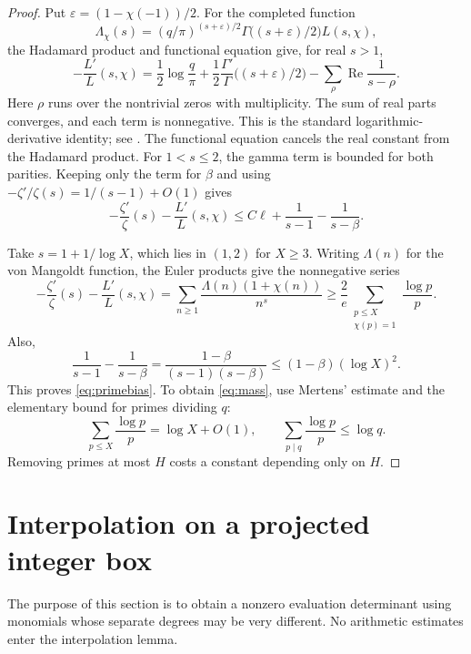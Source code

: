 \documentclass[11pt,a4paper]{amsart}
\theoremstyle{remark}
\numberwithin{equation}{section}
\begin{document}
\begin{proof}
Put $\varepsilon=(1-\chi(-1))/2$. For the completed function
\[
 \Lambda_\chi(s)=
 (q/\pi)^{(s+\varepsilon)/2}
 \Gamma\bigl((s+\varepsilon)/2\bigr)L(s,\chi),
\]
the Hadamard product and functional equation give, for real $s>1$,
\begin{equation}\label{eq:hadamard}
 -\frac{L'}{L}(s,\chi)
 =\frac12\log\frac q\pi
  +\frac12\frac{\Gamma'}{\Gamma}
        \bigl((s+\varepsilon)/2\bigr)
  -\sum_\rho\operatorname{Re}\frac1{s-\rho}.
\end{equation}
Here $\rho$ runs over the nontrivial zeros with multiplicity. The sum
of real parts converges, and each term is nonnegative. This is the
standard logarithmic-derivative identity; see
\cite[Sections~12 and 14]{Davenport}. The functional equation cancels
the real constant from the Hadamard product. For $1<s\le2$, the gamma
term is bounded for both parities. Keeping only the term for $\beta$
and using $-\zeta'/\zeta(s)=1/(s-1)+O(1)$ gives
\begin{equation}\label{eq:logderivative}
 -\frac{\zeta'}{\zeta}(s)-\frac{L'}{L}(s,\chi)
 \le C\ell+\frac1{s-1}-\frac1{s-\beta}.
\end{equation}

Take $s=1+1/\log X$, which lies in $(1,2)$ for $X\ge3$.
Writing $\Lambda(n)$ for the von Mangoldt function, the Euler
products give the nonnegative series
\[
 -\frac{\zeta'}{\zeta}(s)-\frac{L'}{L}(s,\chi)
 =\sum_{n\ge1}\frac{\Lambda(n)(1+\chi(n))}{n^s}
 \ge\frac2e\sum_{\substack{p\le X\\\chi(p)=1}}\frac{\log p}{p}.
\]
Also,
\[
 \frac1{s-1}-\frac1{s-\beta}
 =\frac{1-\beta}{(s-1)(s-\beta)}
 \le(1-\beta)(\log X)^2.
\]
This proves \eqref{eq:primebias}. To obtain \eqref{eq:mass}, use
Mertens' estimate and the elementary bound for primes dividing $q$:
\[
 \sum_{p\le X}\frac{\log p}{p}=\log X+O(1),
 \qquad \sum_{p\mid q}\frac{\log p}{p}\le\log q.
\]
Removing primes at most $H$ costs a constant depending only on $H$.
\end{proof}

\section{Interpolation on a projected integer box}\label{sec:interpolation}

The purpose of this section is to obtain a nonzero evaluation
determinant using monomials whose separate degrees may be very
different. No arithmetic estimates enter the interpolation lemma.
\end{document}
